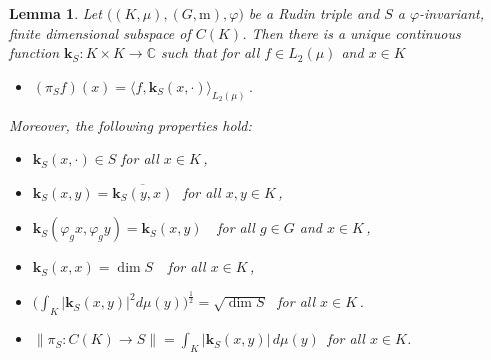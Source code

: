 \documentclass[12pt]{amsart}
\numberwithin{subsection}{section}
\newtheorem{lemma}[theorem]{Lemma}
\theoremstyle{definition}
\theoremstyle{remark}
\begin{document}

\smallskip

\begin{lemma}\label{theorem kernel0}
Let $\big((K,\mu),(G,\mathrm{m}),\varphi\big)$ be a Rudin triple and  $S$ a $\varphi$-invariant, finite dimensional subspace of $C(K)$.
 Then there is a unique continuous function $\mathbf{k}_S: K\times K \to \mathbb C$ such that
for all $f\in L_2(\mu)$  and $x \in K$
\begin{itemize}
\item[(i)]
$
(\pi_Sf)(x)=\big\langle f, \mathbf{k}_S(x, \cdot)\big\rangle_{L_2(\mu)}\,.
$
\end{itemize}
Moreover, the following properties hold{\rm:}
\begin{itemize}
\item[(ii)]
$\mathbf{k}_S(x, \cdot)\in S$\,\,for all $x \in K$\,,
\item[(iii)]
$\mathbf{k}_S(x, y)=\overline{\mathbf{k}_S(y, x)}$ \,\,for all $x,y \in K$\,,
\item[(iv)]
$\mathbf{k}_S(\varphi_gx,\varphi_gy)
=
\mathbf{k}_S(x,y)
$
\,\, for all $g \in G$ and $x  \in K$\,,
\item[(v)]
$\mathbf{k}_S(x,x) = \dim S$ \,\, for all  $x \in K$\,,
\item[(vi)]
$\big(\int_K |\mathbf{k}_S(x, y)|^2 d\mu(y)\big)^{\frac{1}{2}}= \sqrt{\dim S}$\,\, for all  $x \in K$\,.
\item[(vii)] 
  $
 \big\|\pi_S:C(K) \to S\big\|=\int_{K }|\mathbf{k}_S(x,y) |\, d\mu(y) \,$
for all $x\in K$.
\end{itemize}
\end{lemma}



\end{document}

